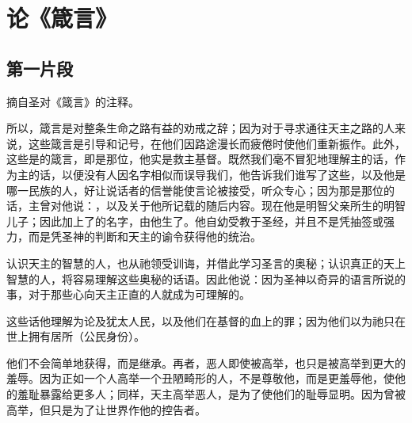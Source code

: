 
\section{论《箴言》}


\subsection{第一片段}

摘自圣对《箴言》的注释。\par

所以，箴言是对整条生命之路有益的劝戒之辞；因为对于寻求通往天主之路的人来说，这些箴言是引导和记号，在他们因路途漫长而疲倦时使他们重新振作。此外，这些是的箴言，即是那位，他实是救主基督。既然我们毫不冒犯地理解主的话，作为主的话，以便没有人因名字相似而误导我们，他告诉我们谁写了这些，以及他是哪一民族的人，好让说话者的信誉能使言论被接受，听众专心；因为那是那位的话，主曾对他说：，以及关于他所记载的随后内容。现在他是明智父亲所生的明智儿子；因此加上了的名字，由他生了。他自幼受教于圣经，并且不是凭抽签或强力，而是凭圣神的判断和天主的谕令获得他的统治。\newline{}\par

认识天主的智慧的人，也从祂领受训诲，并借此学习圣言的奥秘；认识真正的天上智慧的人，将容易理解这些奥秘的话语。因此他说：因为圣神以奇异的语言所说的事，对于那些心向天主正直的人就成为可理解的。\newline{}\par

这些话他理解为论及犹太人民，以及他们在基督的血上的罪；因为他们以为祂只在世上拥有居所（公民身份）。\newline{}\par

他们不会简单地获得，而是继承。再者，恶人即使被高举，也只是被高举到更大的羞辱。因为正如一个人高举一个丑陋畸形的人，不是尊敬他，而是更羞辱他，使他的羞耻暴露给更多人；同样，天主高举恶人，是为了使他们的耻辱显明。因为曾被高举，但只是为了让世界作他的控告者。\newline{}\par

